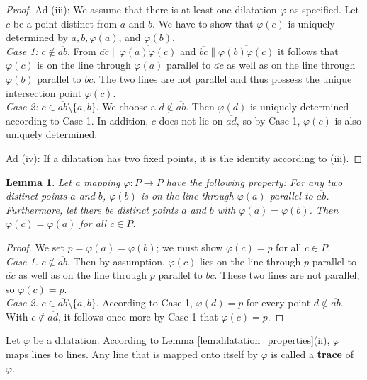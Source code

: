 \documentclass[11pt,a4paper]{article}
\newcommand{\lineab}[1]{\overline{#1}}
\newtheorem{lemma}[theorem]{Lemma}
\begin{document}
\begin{proof}
Ad (iii): We assume that there is at least one dilatation $\varphi$ as specified. Let $c$ be a point distinct from $a$ and $b$. We have to show that $\varphi(c)$ is uniquely determined by $a, b, \varphi(a)$, and $\varphi(b)$. \\
\textit{Case 1:} $c \notin \lineab{ab}$. From $\lineab{ac} \parallel \lineab{\varphi(a)\varphi(c)}$ and $\lineab{bc} \parallel \lineab{\varphi(b)\varphi(c)}$ it follows that $\varphi(c)$ is on the line through $\varphi(a)$ parallel to $\lineab{ac}$ as well as on the line through $\varphi(b)$ parallel to $\lineab{bc}$. The two lines are not parallel and thus possess the unique intersection point $\varphi(c)$. \\
\textit{Case 2:} $c \in \lineab{ab} \setminus \{a, b\}$. We choose a $d \notin \lineab{ab}$. Then $\varphi(d)$ is uniquely determined according to Case 1. In addition, $c$ does not lie on $\lineab{ad}$, so by Case 1, $\varphi(c)$ is also uniquely determined.

Ad (iv): If a dilatation has two fixed points, it is the identity according to (iii).
\end{proof}

\begin{lemma} \label{lem:unique_fixed_point_dilatation}
Let a mapping $\varphi: P \to P$ have the following property: For any two distinct points $a$ and $b$, $\varphi(b)$ is on the line through $\varphi(a)$ parallel to $\lineab{ab}$. Furthermore, let there be distinct points $a$ and $b$ with $\varphi(a) = \varphi(b)$. Then $\varphi(c) = \varphi(a)$ for all $c \in P$.
\end{lemma}

\begin{proof}
We set $p = \varphi(a) = \varphi(b)$; we must show $\varphi(c) = p$ for all $c \in P$. \\
\textit{Case 1.} $c \notin \lineab{ab}$. Then by assumption, $\varphi(c)$ lies on the line through $p$ parallel to $\lineab{ac}$ as well as on the line through $p$ parallel to $\lineab{bc}$. These two lines are not parallel, so $\varphi(c) = p$. \\
\textit{Case 2.} $c \in \lineab{ab} \setminus \{a, b\}$. According to Case 1, $\varphi(d) = p$ for every point $d \notin \lineab{ab}$. With $c \notin \lineab{ad}$, it follows once more by Case 1 that $\varphi(c) = p$.
\end{proof}

Let $\varphi$ be a dilatation. According to Lemma \ref{lem:dilatation_properties}(ii), $\varphi$ maps lines to lines. Any line that is mapped onto itself by $\varphi$ is called a \textbf{trace} of $\varphi$.
\end{document}
